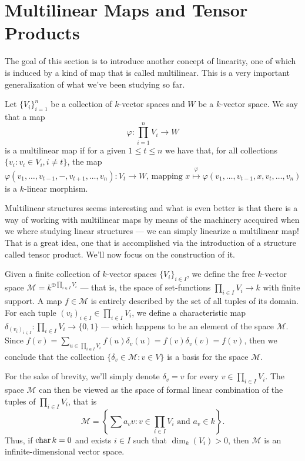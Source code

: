 
\section{Multilinear Maps and Tensor Products}

The goal of this section is to introduce another concept of linearity, one of
which is induced by a kind of map that is called multilinear. This is a very
important generalization of what we've been studying so far.

\begin{definition}\label{def: multilinear map}
  Let \(\{V_i\}_{i=1}^n\) be a collection of \(k\)-vector spaces and \(W\) be a
  \(k\)-vector space. We say that a map
  \[
    \varphi: \prod_{i=1}^n V_i \to W
  \]
  is a multilinear map if for a given \(1 \leq t \leq n\) we have that, for all
  collections \(\{v_i : v_i \in V_i, i \neq t\}\), the map
  \[
    \varphi(v_1, \dots, v_{t-1}, -, v_{t+1}, \dots, v_n):
    V_t \longrightarrow W
    \text{, mapping }
    x \overset{\varphi}\longmapsto \varphi(v_1, \dots, v_{t-1}, x, v_t, \dots, v_n)
  \]
  is a \(k\)-linear morphism.
\end{definition}

Multilinear structures seems interesting and what is even better is that there
is a way of working with multilinear maps by means of the machinery accquired
when we where studying linear structures --- we can simply linearize a multilinear
map! That is a great idea, one that is accomplished via the introduction of a
structure called tensor product. We'll now focus on the construction of it.

Given a finite collection of \(k\)-vector spaces \(\{V_i\}_{i \in I}\), we define
the free \(k\)-vector space \(\mathcal M = k^{\oplus \prod_{i \in I} V_i}\) --- that is, the
space of set-functions \(\prod_{i \in I} V_i \to k\) with finite support. A map \(f \in
\mathcal M\) is entirely described by the set of all tuples of its domain. For
each tuple \((v_i)_{i \in I} \in \prod_{i \in I} V_i\), we define a characteristic map
\(\delta_{(v_{i})_{i \in I}}: \prod_{i \in I} V_i \to \{0, 1\}\) --- which happens to be an
element of the space \(\mathcal M\). Since \(f(v) = \sum_{u \in \prod_{i \in I}V_i} f(u)
\delta_v(u) = f(v) \delta_v(v) = f(v)\), then we conclude that the collection \(\{\delta_{v} \in
\mathcal M : v \in V\}\) is a basis for the space \(\mathcal M\).

For the sake of brevity, we'll simply denote \(\delta_v = v\) for every \(v \in \prod_{i \in
I} V_i\). The space \(\mathcal M\) can then be viewed as the space of formal
linear combination of the tuples of \(\prod_{i \in I} V_i\), that is
\[
  \mathcal M =
  \left\{
    \sum a_v v : v \in \prod_{i \in I} V_i \text{ and } a_v \in k
  \right\}.
\]
Thus, if \(\operatorname{char} k = 0\) and exists \(i \in I\) such that \(\dim_k(V_i) >
0\), then \(\mathcal M\) is an infinite-dimensional vector space.

